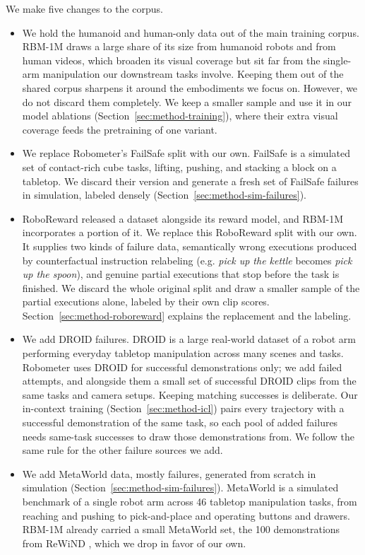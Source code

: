 We make five changes to the corpus.

\begin{itemize}
    \item We hold the humanoid and human-only data out of the main training corpus. RBM-1M draws a large share of its size from humanoid robots and from human videos, which broaden its visual coverage but sit far from the single-arm manipulation our downstream tasks involve. Keeping them out of the shared corpus sharpens it around the embodiments we focus on. However, we do not discard them completely. We keep a smaller sample and use it in our model ablations (Section~\ref{sec:method-training}), where their extra visual coverage feeds the pretraining of one variant.
    \item We replace Robometer's FailSafe split with our own. FailSafe \citep{lin_failsafe_2025} is a simulated set of contact-rich cube tasks, lifting, pushing, and stacking a block on a tabletop. We discard their version and generate a fresh set of FailSafe failures in simulation, labeled densely (Section~\ref{sec:method-sim-failures}).
    \item RoboReward \citep{roboreward} released a dataset alongside its reward model, and RBM-1M incorporates a portion of it. We replace this RoboReward split with our own. It supplies two kinds of failure data, semantically wrong executions produced by counterfactual instruction relabeling (e.g. \textit{pick up the kettle} becomes \textit{pick up the spoon}), and genuine partial executions that stop before the task is finished. We discard the whole original split and draw a smaller sample of the partial executions alone, labeled by their own clip scores. Section~\ref{sec:method-roboreward} explains the replacement and the labeling.
    \item We add DROID \citep{khazatsky_droid_2024} failures. DROID is a large real-world dataset of a robot arm performing everyday tabletop manipulation across many scenes and tasks. Robometer uses DROID for successful demonstrations only; we add failed attempts, and alongside them a small set of successful DROID clips from the same tasks and camera setups. Keeping matching successes is deliberate. Our in-context training (Section~\ref{sec:method-icl}) pairs every trajectory with a successful demonstration of the same task, so each pool of added failures needs same-task successes to draw those demonstrations from. We follow the same rule for the other failure sources we add.
    \item We add MetaWorld \citep{yu_meta-world_2019, mclean_meta-world_2025} data, mostly failures, generated from scratch in simulation (Section~\ref{sec:method-sim-failures}). MetaWorld is a simulated benchmark of a single robot arm across 46 tabletop manipulation tasks, from reaching and pushing to pick-and-place and operating buttons and drawers. RBM-1M already carried a small MetaWorld set, the 100 demonstrations from ReWiND \citep{zhang_rewind_2025}, which we drop in favor of our own.
\end{itemize}

